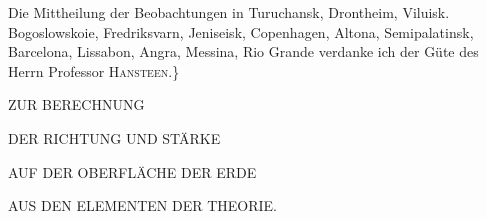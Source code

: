 Die Mittheilung der Beobachtungen in Turuchansk, Drontheim, Viluisk. Bogoslowskoie, Fredriksvarn, Jeniseisk, Copenhagen, Altona, Semipalatinsk, Barcelona, Lissabon, Angra, Messina, Rio Grande verdanke ich der Güte des Herrn Professor \textsc{Hansteen}.\}\par
\medskip
\noindent\makebox[\linewidth]{\rule{.255\linewidth}{.35pt}}\par
\clearpage
\thispagestyle{empty}
\begin{center}
\vspace*{1in}
{\Large{}\par}
\bigskip
ZUR BERECHNUNG\par
\bigskip
{\large DER RICHTUNG UND STÄRKE\par}
\bigskip
{\LARGE{}\par}
\bigskip
AUF DER OBERFLÄCHE DER ERDE\par
\bigskip
{\large AUS DEN ELEMENTEN DER THEORIE.\par}
\end{center}
\clearpage
{}
\begingroup
\fontsize{9}{10.2}\selectfont
\setlength{\tabcolsep}{1.5pt}
\renewcommand{\arraystretch}{1.02}
